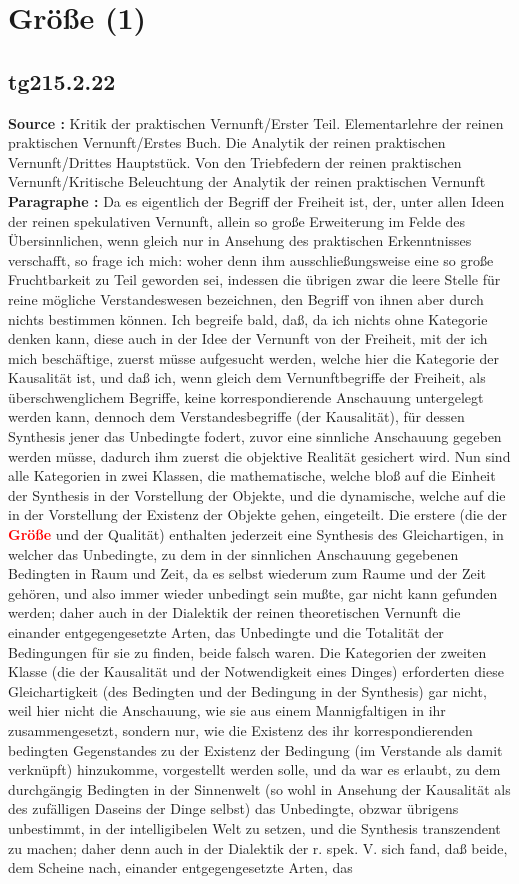 \documentclass[a4paper,12pt,twoside]{book}
\newcommand{\match}[1]{\textcolor{red}{\textbf{#1}}}
\newcommand{\unnumberedsection}[1]{
	\section*{#1}
	\addcontentsline{toc}{section}{#1}
	\markright{#1}
}
\begin{document}
	\unnumberedsection{Größe (1)} 
	\subsection*{tg215.2.22} 
	\textbf{Source : }Kritik der praktischen Vernunft/Erster Teil. Elementarlehre der reinen praktischen Vernunft/Erstes Buch. Die Analytik der reinen praktischen Vernunft/Drittes Hauptstück. Von den Triebfedern der reinen praktischen Vernunft/Kritische Beleuchtung der Analytik der reinen praktischen Vernunft\\  
	
	\textbf{Paragraphe : }Da es eigentlich der Begriff der Freiheit ist, der, unter allen Ideen der reinen spekulativen Vernunft, allein so große Erweiterung im Felde des Übersinnlichen, wenn gleich nur in Ansehung des praktischen Erkenntnisses verschafft, so frage ich mich: woher denn ihm ausschließungsweise eine so große Fruchtbarkeit zu Teil geworden sei, indessen die übrigen zwar die leere Stelle für reine mögliche Verstandeswesen bezeichnen, den Begriff von ihnen aber durch nichts bestimmen können. Ich begreife bald, daß, da ich nichts ohne Kategorie denken kann, diese auch in der Idee der Vernunft von der Freiheit, mit der ich mich beschäftige, zuerst müsse aufgesucht werden, welche hier die Kategorie der Kausalität ist, und daß ich, wenn gleich dem Vernunftbegriffe der Freiheit, als überschwenglichem Begriffe, keine korrespondierende Anschauung untergelegt werden kann, dennoch dem Verstandesbegriffe (der Kausalität), für dessen Synthesis jener das Unbedingte fodert, zuvor eine sinnliche Anschauung gegeben werden müsse, dadurch ihm zuerst die objektive Realität gesichert wird. Nun sind alle Kategorien in zwei Klassen, die mathematische, welche bloß auf die Einheit der Synthesis in der Vorstellung der Objekte, und die dynamische, welche auf die in der Vorstellung der Existenz der Objekte gehen, eingeteilt. Die erstere (die der \match{Größe} und der Qualität) enthalten jederzeit eine Synthesis des Gleichartigen, in welcher das Unbedingte, zu dem in der sinnlichen Anschauung gegebenen Bedingten in Raum und Zeit, da es selbst wiederum zum Raume und der Zeit gehören, und also  immer wieder unbedingt sein mußte, gar nicht kann gefunden werden; daher auch in der Dialektik der reinen theoretischen Vernunft die einander entgegengesetzte Arten, das Unbedingte und die Totalität der Bedingungen für sie zu finden, beide falsch waren. Die Kategorien der zweiten Klasse (die der Kausalität und der Notwendigkeit eines Dinges) erforderten diese Gleichartigkeit (des Bedingten und der Bedingung in der Synthesis) gar nicht, weil hier nicht die Anschauung, wie sie aus einem Mannigfaltigen in ihr zusammengesetzt, sondern nur, wie die Existenz des ihr korrespondierenden bedingten Gegenstandes zu der Existenz der Bedingung (im Verstande als damit verknüpft) hinzukomme, vorgestellt werden solle, und da war es erlaubt, zu dem durchgängig Bedingten in der Sinnenwelt (so wohl in Ansehung der Kausalität als des zufälligen Daseins der Dinge selbst) das Unbedingte, obzwar übrigens unbestimmt, in der intelligibelen Welt zu setzen, und die Synthesis transzendent zu machen; daher denn auch in der Dialektik der r. spek. V. sich fand, daß beide, dem Scheine nach, einander entgegengesetzte Arten, das 
\end{document}
